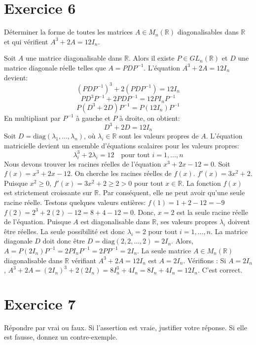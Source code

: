 \section{Exercice 6}
Déterminer la forme de toutes les matrices $A \in M_n(\mathbb{R})$ diagonalisables dans $\mathbb{R}$ et qui vérifient $A^3 + 2A = 12I_n$.

\begin{solution}
Soit $A$ une matrice diagonalisable dans $\mathbb{R}$. Alors il existe $P \in GL_n(\mathbb{R})$ et $D$ une matrice diagonale réelle telles que $A = PDP^{-1}$.
L'équation $A^3 + 2A = 12I_n$ devient:
\[ (PDP^{-1})^3 + 2(PDP^{-1}) = 12I_n \]
\[ PD^3P^{-1} + 2PDP^{-1} = 12PI_nP^{-1} \]
\[ P(D^3 + 2D)P^{-1} = P(12I_n)P^{-1} \]
En multipliant par $P^{-1}$ à gauche et $P$ à droite, on obtient:
\[ D^3 + 2D = 12I_n \]
Soit $D = \text{diag}(\lambda_1, \dots, \lambda_n)$, où $\lambda_i \in \mathbb{R}$ sont les valeurs propres de $A$. L'équation matricielle devient un ensemble d'équations scalaires pour les valeurs propres:
\[ \lambda_i^3 + 2\lambda_i = 12 \quad \text{pour tout } i=1, \dots, n \]
Nous devons trouver les racines réelles de l'équation $x^3 + 2x - 12 = 0$.
Soit $f(x) = x^3 + 2x - 12$. On cherche les racines réelles de $f(x)$.
$f'(x) = 3x^2 + 2$. Puisque $x^2 \ge 0$, $f'(x) = 3x^2 + 2 \ge 2 > 0$ pour tout $x \in \mathbb{R}$.
La fonction $f(x)$ est strictement croissante sur $\mathbb{R}$. Par conséquent, elle ne peut avoir qu'une seule racine réelle.
Testons quelques valeurs entières:
$f(1) = 1+2-12 = -9$
$f(2) = 2^3 + 2(2) - 12 = 8 + 4 - 12 = 0$.
Donc, $x=2$ est la seule racine réelle de l'équation.
Puisque $A$ est diagonalisable dans $\mathbb{R}$, ses valeurs propres $\lambda_i$ doivent être réelles. La seule possibilité est donc $\lambda_i = 2$ pour tout $i=1, \dots, n$.
La matrice diagonale $D$ doit donc être $D = \text{diag}(2, 2, \dots, 2) = 2I_n$.
Alors, $A = P(2I_n)P^{-1} = 2P I_n P^{-1} = 2P P^{-1} = 2I_n$.
La seule matrice $A \in M_n(\mathbb{R})$ diagonalisable dans $\mathbb{R}$ vérifiant $A^3 + 2A = 12I_n$ est $A = 2I_n$.
Vérifions : Si $A=2I_n$, $A^3+2A = (2I_n)^3 + 2(2I_n) = 8I_n^3 + 4I_n = 8I_n + 4I_n = 12I_n$. C'est correct.
\end{solution}

\section{Exercice 7}
Répondre par vrai ou faux. Si l’assertion est vraie, justifier votre réponse. Si elle est fausse, donnez un contre-exemple.

